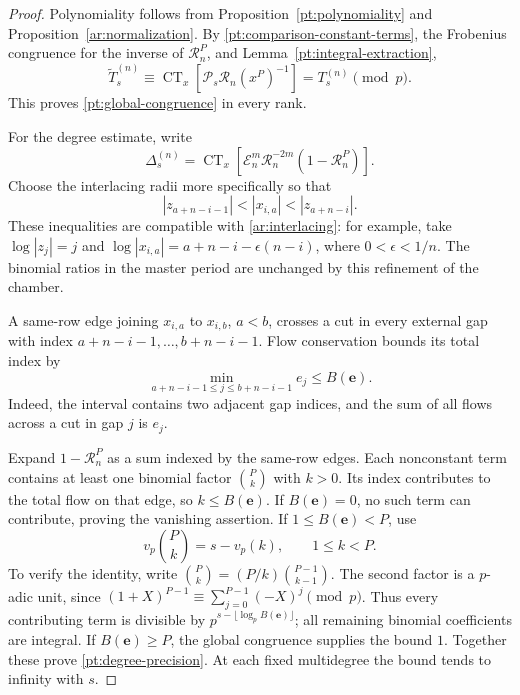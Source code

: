 \documentclass[11pt]{amsart}
\theoremstyle{definition}
\theoremstyle{remark}
\numberwithin{equation}{section}
\DeclareMathOperator{\CT}{CT}
\begin{document}
\begin{proof}
Polynomiality follows from Proposition~\ref{pt:polynomiality}
and Proposition~\ref{ar:normalization}. By
\eqref{pt:comparison-constant-terms}, the Frobenius congruence
for the inverse of $\mathscr R_n^P$, and
Lemma~\ref{pt:integral-extraction},
\[
 \widetilde T_s^{(n)}
 \equiv\CT_x[\mathscr P_s\mathscr R_n(x^P)^{-1}]
 =T_s^{(n)}\pmod p.
\]
This proves \eqref{pt:global-congruence} in every rank.

For the degree estimate, write
\begin{equation}\label{pt:difference-kernel}
 \Delta_s^{(n)}=\CT_x\left[
 \mathscr E_n^m\mathscr R_n^{-2m}(1-\mathscr R_n^P)\right].
\end{equation}
Choose the interlacing radii more specifically so that
\[
 |z_{a+n-i-1}|<|x_{i,a}|<|z_{a+n-i}|.
\]
These inequalities are compatible with
\eqref{ar:interlacing}: for example, take
$\log|z_j|=j$ and
$\log|x_{i,a}|=a+n-i-\epsilon(n-i)$, where
$0<\epsilon<1/n$. The binomial ratios in the master period
are unchanged by this refinement of the chamber.

A same-row edge joining $x_{i,a}$ to $x_{i,b}$, $a<b$, crosses
a cut in every external gap with index
$a+n-i-1,\ldots,b+n-i-1$. Flow conservation bounds its total
index by
\[
 \min_{a+n-i-1\leq j\leq b+n-i-1}e_j
 \leq B(\boldsymbol e).
\]
Indeed, the interval contains two adjacent gap indices, and the
sum of all flows across a cut in gap $j$ is $e_j$.

Expand $1-\mathscr R_n^P$ as a sum indexed by the same-row
edges. Each nonconstant term contains at least one binomial
factor $\binom Pk$ with $k>0$. Its index contributes to the total
flow on that edge, so $k\leq B(\boldsymbol e)$. If
$B(\boldsymbol e)=0$, no such term can contribute, proving the
vanishing assertion. If $1\leq B(\boldsymbol e)<P$, use
\begin{equation}\label{pt:binomial-valuation}
 v_p\binom Pk=s-v_p(k),\qquad 1\leq k<P.
\end{equation}
To verify the identity, write
$\binom Pk=(P/k)\binom{P-1}{k-1}$. The second factor is a
$p$-adic unit, since
$(1+X)^{P-1}\equiv\sum_{j=0}^{P-1}(-X)^j\pmod p$.
Thus every contributing term is divisible by
$p^{s-\lfloor\log_pB(\boldsymbol e)\rfloor}$; all remaining
binomial coefficients are integral. If
$B(\boldsymbol e)\geq P$, the global congruence supplies the
bound $1$. Together these prove \eqref{pt:degree-precision}.
At each fixed multidegree the bound tends to infinity with $s$.
\end{proof}
\end{document}
